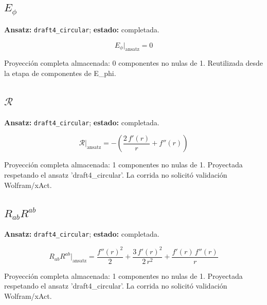 \documentclass[11pt]{article}
\begin{document}
\subsection*{$ E_{\phi} $}
\textbf{Ansatz:} \texttt{draft4\_circular}; \textbf{estado:} completada.\par
\begin{dmath*}[breakdepth={5}]
E_{\phi}\big|_{\mathrm{ansatz}} = 0
\end{dmath*}
\par\smallskip
Proyección completa almacenada: 0 componentes no nulas de 1. Reutilizada desde la etapa de componentes de E\_phi.\par\medskip
{}
\subsection*{$ \mathcal{R} $}
\textbf{Ansatz:} \texttt{draft4\_circular}; \textbf{estado:} completada.\par
\begin{dmath*}[breakdepth={5}]
\mathcal{R}\big|_{\mathrm{ansatz}} = -\left(\frac{2\,f'\!\left(r\right)}{r} + f''\!\left(r\right)\right)
\end{dmath*}
\par\smallskip
Proyección completa almacenada: 1 componentes no nulas de 1. Proyectada respetando el ansatz 'draft4\_circular'. La corrida no solicitó validación Wolfram/xAct.\par\medskip
{}
\subsection*{$ R_{ab}R^{ab} $}
\textbf{Ansatz:} \texttt{draft4\_circular}; \textbf{estado:} completada.\par
\begin{dmath*}[breakdepth={5}]
R_{ab}R^{ab}\big|_{\mathrm{ansatz}} = \frac{{f''\!\left(r\right)}^{2}}{2} + \frac{3\,{f'\!\left(r\right)}^{2}}{2\,{r}^{2}} + \frac{f'\!\left(r\right)\,f''\!\left(r\right)}{r}
\end{dmath*}
\par\smallskip
Proyección completa almacenada: 1 componentes no nulas de 1. Proyectada respetando el ansatz 'draft4\_circular'. La corrida no solicitó validación Wolfram/xAct.\par\medskip
{}
\end{document}

